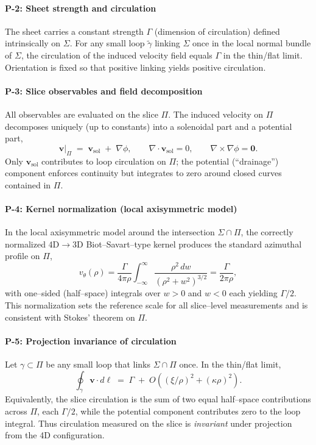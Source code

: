 \paragraph{P-2: Sheet strength and circulation}
\label{post:P2}
The sheet carries a constant strength $\Gamma$ (dimension of circulation) defined intrinsically on $\Sigma$. For any small loop $\tilde{\gamma}$ linking $\Sigma$ once in the local normal bundle of $\Sigma$, the circulation of the induced velocity field equals $\Gamma$ in the thin/flat limit. Orientation is fixed so that positive linking yields positive circulation.

\paragraph{P-3: Slice observables and field decomposition}
\label{post:P3}
All observables are evaluated on the slice $\Pi$. The induced velocity on $\Pi$ decomposes uniquely (up to constants) into a solenoidal part and a potential part,
\[
\mathbf{v}\big|_{\Pi} \;=\; \mathbf{v}_\mathrm{sol} \;+\; \nabla\phi,
\qquad \nabla\cdot\mathbf{v}_\mathrm{sol}=0, \qquad \nabla\times\nabla\phi=\mathbf{0}.
\]
Only $\mathbf{v}_\mathrm{sol}$ contributes to loop circulation on $\Pi$; the potential (``drainage'') component enforces continuity but integrates to zero around closed curves contained in $\Pi$.

\paragraph{P-4: Kernel normalization (local axisymmetric model)}
\label{post:P4}
In the local axisymmetric model around the intersection $\Sigma\cap\Pi$, the correctly normalized 4D$\!\to$3D Biot–Savart–type kernel produces the standard azimuthal profile on $\Pi$,
\[
v_\theta(\rho)
=\frac{\Gamma}{4\pi\rho}\!\int_{-\infty}^{\infty}\frac{\rho^2\,dw}{(\rho^2+w^2)^{3/2}}
=\frac{\Gamma}{2\pi\rho},
\]
with one–sided (half–space) integrals over $w>0$ and $w<0$ each yielding $\Gamma/2$. This normalization sets the reference scale for all slice–level measurements and is consistent with Stokes’ theorem on $\Pi$.

\paragraph{P-5: Projection invariance of circulation}
\label{post:P5}
Let $\gamma\subset\Pi$ be any small loop that links $\Sigma\cap\Pi$ once. In the thin/flat limit,
\[
\oint_{\gamma}\mathbf{v}\cdot d\boldsymbol{\ell}\;=\;\Gamma
\;+\; O\!\left((\xi/\rho)^2+(\kappa\rho)^2\right).
\]
Equivalently, the slice circulation is the sum of two equal half–space contributions across $\Pi$, each $\Gamma/2$, while the potential component contributes zero to the loop integral. Thus circulation measured on the slice is \emph{invariant} under projection from the 4D configuration.

